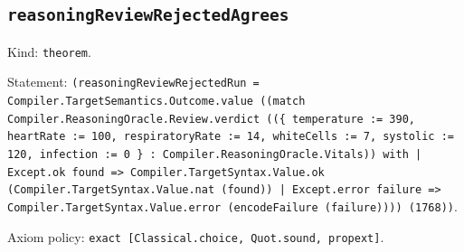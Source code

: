 \documentclass[11pt]{article}
\begin{document}
\subsection*{\texttt{reasoningReviewRejectedAgrees}}
\noindent Kind: \texttt{theorem}.\par
\noindent Statement: \texttt{(reasoningReviewRejectedRun = Compiler.TargetSemantics.Outcome.value ((match Compiler.ReasoningOracle.Review.verdict ((\{ temperature := 390, heartRate := 100, respiratoryRate := 14, whiteCells := 7, systolic := 120, infection := 0 \} : Compiler.ReasoningOracle.Vitals)) with | Except.ok found => Compiler.TargetSyntax.Value.ok (Compiler.TargetSyntax.Value.nat (found)) | Except.error failure => Compiler.TargetSyntax.Value.error (encodeFailure (failure)))) (1768))}.\par
\noindent Axiom policy: \texttt{exact [Classical.choice, Quot.sound, propext]}.\par
\end{document}
